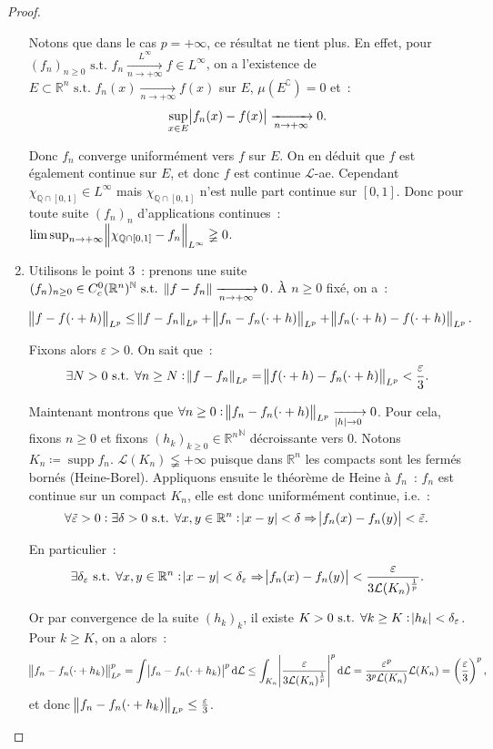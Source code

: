\documentclass{article}
\theoremstyle{definition}
\newcommand{\pinfty}{{+\infty}}
\newcommand{\st}{\text{ s.t. }}
\newcommand{\C}{\complement}
\newcommand{\N}{{\mathbb N}}
\newcommand{\Q}{{\mathbb Q}}
\newcommand{\R}{{\mathbb R}}
\DeclareMathOperator{\supp}{supp}
\begin{document}
\begin{proof}
\begin{enumerate}
	Notons que dans le cas $p = \pinfty$, ce résultat ne tient plus. En effet, pour $(f_n)_{n \geq 0} \st f_n \xrightarrow[n \to \pinfty]{L^\infty} f \in L^\infty$, on a
	l'existence de $E \subset \R^n \st f_n(x) \xrightarrow[n \to \pinfty]{} f(x)$ sur $E$, $\mu(E^\C) = 0$ et~:
	\[\sup_{x \in E}\abs {f_n(x)-f(x)} \xrightarrow[n \to \pinfty]{} 0.\]

	Donc $f_n$ converge uniformément vers $f$ sur $E$. On en déduit que $f$ est également continue sur $E$, et donc $f$ est continue $\mathcal L$-ae. Cependant
	$\chi_{\Q \cap [0, 1]} \in L^\infty$ mais $\chi_{\Q \cap [0, 1]}$ n'est nulle part continue sur $[0, 1]$. Donc pour toute suite $(f_n)_n$ d'applications continues~:
	$\limsup_{n \to \pinfty}\norm {\chi_{\Q \cap [0, 1]}-f_n}_{L^\infty} \gneqq 0$.

	\item Utilisons le point 3~: prenons une suite $(f_n)_{n \geq 0} \in C_c^0(\R^n)^\N \st \norm {f-f_n} \xrightarrow[n \to \pinfty]{} 0$. À $n \geq 0$ fixé, on a~:
	\[\norm {f-f(\cdot+h)}_{L^p} \leq \norm {f-f_n}_{L^p} + \norm {f_n-f_n(\cdot + h)}_{L^p} + \norm {f_n(\cdot+h)-f(\cdot+h)}_{L^p}.\]

	Fixons alors $\varepsilon > 0$. On sait que~:
	\[\exists N > 0 \st \forall n \geq N : \norm {f-f_n}_{L^p} = \norm {f(\cdot+h)-f_n(\cdot+h)}_{L^p} < \frac \varepsilon3.\]

	Maintenant montrons que $\forall n \geq 0 : \norm {f_n-f_n(\cdot+h)}_{L^p} \xrightarrow[\abs h \to 0]{} 0$. Pour cela, fixons $n \geq 0$ et fixons
	$(h_k)_{k \geq 0} \in {\R^n}^\N$ décroissante vers $0$. Notons $K_n \coloneqq \supp f_n$. $\mathcal L(K_n) \lneqq \pinfty$ puisque dans $\R^n$ les compacts sont les fermés bornés
	(Heine-Borel). Appliquons ensuite le théorème de Heine à $f_n$~: $f_n$ est continue sur un compact $K_n$, elle est donc uniformément continue, i.e.~:
	\[\forall \tilde \varepsilon > 0 : \exists \delta > 0 \st \forall x, y \in \R^n : \abs {x-y} < \delta \Rightarrow \abs {f_n(x)-f_n(y)} < \tilde \varepsilon.\]

	En particulier~:
	\[\exists \delta_\varepsilon \st \forall x, y \in \R^n : \abs {x-y} < \delta_\varepsilon \Rightarrow \abs {f_n(x)-f_n(y)} < \frac {\varepsilon}{3\mathcal L(K_n)^{\frac 1p}}.\]

	Or par convergence de la suite $(h_k)_k$, il existe $K > 0 \st \forall k \geq K : \abs {h_k} < \delta_\varepsilon$. Pour $k \geq K$, on a alors~:
	\[\norm {f_n-f_n(\cdot+h_k)}_{L^p}^p = \int\abs {f_n-f_n(\cdot+h_k)}^p\dif\mathcal L \leq \int_{K_n}\abs {\frac {\varepsilon}{3\mathcal L(K_n)^{\frac 1p}}}^p\dif\mathcal L
		= \frac {\varepsilon^p}{3^p\mathcal L(K_n)}\mathcal L(K_n) = \left(\frac \varepsilon3\right)^p,\]
	et donc $\norm {f_n-f_n(\cdot+h_k)}_{L^p} \leq \frac \varepsilon3$.


\end{enumerate}
\end{proof}
\end{document}
